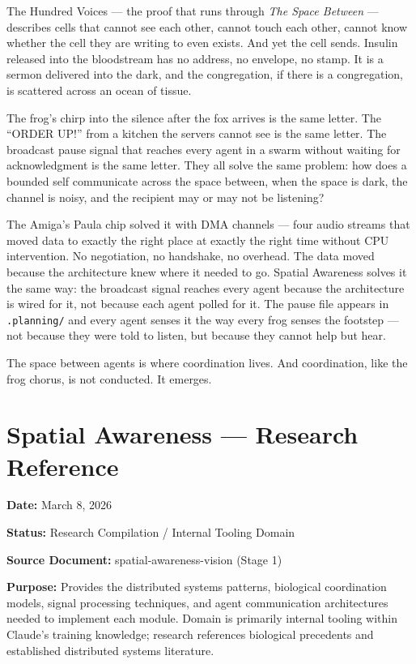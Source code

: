 \documentclass[11pt,letterpaper]{article}
\newcommand{\stageheader}[2]{%
  \noindent\colorbox{#2}{\makebox[\textwidth][l]{%
    \textcolor{white}{\bfseries\sffamily\hspace{6pt}#1\hspace{6pt}}}}%
  \vspace{0.5em}\par%
}
\newcommand{\metafield}[2]{\textbf{\sffamily #1} #2\par}
\begin{document}
The Hundred Voices --- the proof that runs through \textit{The Space Between} --- describes cells that cannot see each other, cannot touch each other, cannot know whether the cell they are writing to even exists. And yet the cell sends. Insulin released into the bloodstream has no address, no envelope, no stamp. It is a sermon delivered into the dark, and the congregation, if there is a congregation, is scattered across an ocean of tissue.

The frog's chirp into the silence after the fox arrives is the same letter. The ``ORDER UP!'' from a kitchen the servers cannot see is the same letter. The broadcast pause signal that reaches every agent in a swarm without waiting for acknowledgment is the same letter. They all solve the same problem: how does a bounded self communicate across the space between, when the space is dark, the channel is noisy, and the recipient may or may not be listening?

The Amiga's Paula chip solved it with DMA channels --- four audio streams that moved data to exactly the right place at exactly the right time without CPU intervention. No negotiation, no handshake, no overhead. The data moved because the architecture knew where it needed to go. Spatial Awareness solves it the same way: the broadcast signal reaches every agent because the architecture is wired for it, not because each agent polled for it. The pause file appears in \texttt{.planning/} and every agent senses it the way every frog senses the footstep --- not because they were told to listen, but because they cannot help but hear.

The space between agents is where coordination lives. And coordination, like the frog chorus, is not conducted. It emerges.

\newpage

\stageheader{STAGE 2 --- RESEARCH REFERENCE}{secondary}

\section{Spatial Awareness --- Research Reference}

\metafield{Date:}{March 8, 2026}
\metafield{Status:}{Research Compilation / Internal Tooling Domain}
\metafield{Source Document:}{spatial-awareness-vision (Stage 1)}
\metafield{Purpose:}{Provides the distributed systems patterns, biological coordination models, signal processing techniques, and agent communication architectures needed to implement each module. Domain is primarily internal tooling within Claude's training knowledge; research references biological precedents and established distributed systems literature.}
\end{document}
